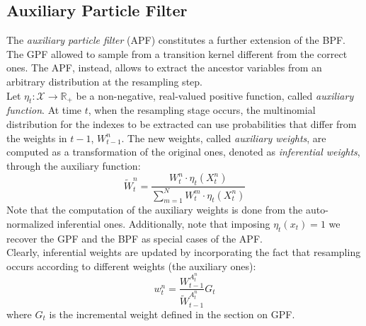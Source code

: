 \documentclass[
]{book}
\theoremstyle{break}
\theoremstyle{nonumberplain}
\begin{document}
\subsection{Auxiliary Particle Filter}

The \textit{auxiliary particle filter} (APF) constitutes a further
extension of the BPF. The GPF allowed to sample from a transition kernel
different from the correct ones. The APF, instead, allows to extract the
ancestor variables from an arbitrary distribution at the resampling
step.~\\
Let \(\eta_t:\mathcal X\rightarrow \mathbb R_+\) be a non-negative,
real-valued positive function, called \textit{auxiliary function}. At
time \(t\), when the resampling stage occurs, the multinomial
distribution for the indexes to be extracted can use probabilities that
differ from the weights in \(t-1\), \(W_{t-1}^n\). The new weights,
called \textit{auxiliary weights}, are computed as a transformation of
the original ones, denoted as \textit{inferential weights}, through the
auxiliary function: \begin{equation}
    \tilde W_t^n=\frac{W_t^n\cdot \eta_t(X_t^n)}{\sum_{m=1}^NW_t^m\cdot \eta_t(X_t^n)}
\end{equation} Note that the computation of the auxiliary weights is
done from the auto-normalized inferential ones. Additionally, note that
imposing \(\eta_t(x_t)=1\) we recover the GPF and the BPF as special
cases of the APF.\\
Clearly, inferential weights are updated by incorporating the fact that
resampling occurs according to different weights (the auxiliary ones):
\begin{equation}
    w_t^n=\frac{W_{t-1}^{A_t^n}}{\tilde W_{t-1}^{A_t^n}}G_t \label{apf_weights_up_}
\end{equation} where \(G_t\) is the incremental weight defined in the
section on GPF.~\\
\end{document}
